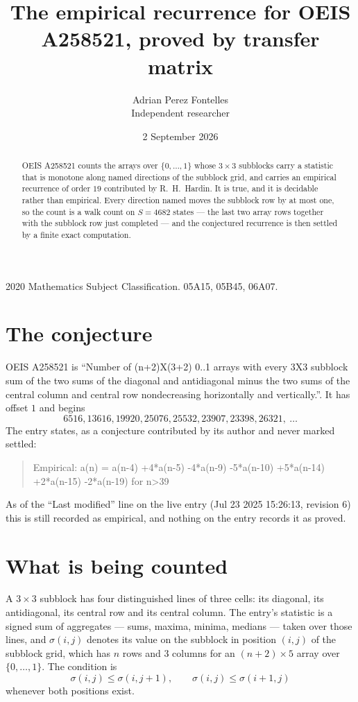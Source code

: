 \documentclass[11pt,a4paper]{article}
\title{The empirical recurrence for OEIS A258521, proved by transfer matrix}
\author{Adrian Perez Fontelles\\ \small Independent researcher}
\date{2 September 2026}
\theoremstyle{plain}
\theoremstyle{definition}
\begin{document}
\maketitle

\begin{abstract}
OEIS A258521 counts the arrays over $\{0,\dots,1\}$ whose $3\times3$ subblocks carry a
statistic that is monotone along named directions of the subblock grid, and carries an
empirical recurrence of order $19$ contributed by R.~H.~Hardin. It is true, and it is
decidable rather than empirical. Every direction named moves the subblock row by at most one,
so the count is a walk count on $S=4682$ states --- the last two array rows together with the
subblock row just completed --- and the conjectured recurrence is then settled by a finite
exact computation.
\end{abstract}

\noindent\small 2020 Mathematics Subject Classification. 05A15, 05B45, 06A07.\normalsize

\section{The conjecture}

OEIS A258521 is ``Number of (n+2)X(3+2) 0..1 arrays with every 3X3 subblock sum of the two sums of the diagonal and antidiagonal minus the two sums of the central column and central row nondecreasing horizontally and vertically.''. It has offset $1$ and begins
\[
6516, 13616, 19920, 25076, 25532, 23907, 23398, 26321,\ \dots
\]
The entry states, as a conjecture contributed by its author and never marked settled:
\begin{quote}
Empirical: a(n) = a(n-4) +4*a(n-5) -4*a(n-9) -5*a(n-10) +5*a(n-14) +2*a(n-15) -2*a(n-19) for n>39
\end{quote}
As of the ``Last modified'' line on the live entry (Jul 23 2025 15:26:13, revision 6) this is still
recorded as empirical, and nothing on the entry records it as proved.

\section{What is being counted}

A $3\times3$ subblock has four distinguished lines of three cells: its diagonal, its
antidiagonal, its central row and its central column. The entry's statistic is a signed sum of
aggregates --- sums, maxima, minima, medians --- taken over those lines, and $\sigma(i,j)$
denotes its value on the subblock in position $(i,j)$ of the subblock grid, which has $n$ rows
and $3$ columns for an $(n+2)\times5$ array over $\{0,\dots,1\}$. The condition is
\[
\sigma(i,j)\le\sigma(i,j+1),\qquad \sigma(i,j)\le\sigma(i+1,j)
\]
whenever both positions exist.
\end{document}
